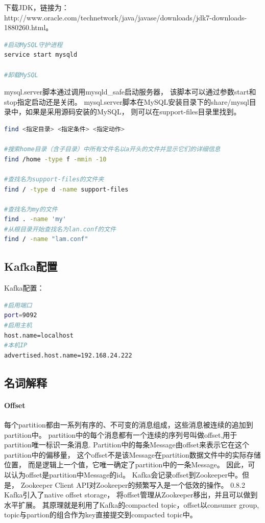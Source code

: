 \documentclass{book}
\begin{document}
下载JDK，链接为：http://www.oracle.com/technetwork/java/javase/downloads/jdk7-downloads-1880260.html。

\begin{lstlisting}[language=Bash]
#启动MySQL守护进程
service start mysqld

#卸载MySQL

\end{lstlisting}

mysql.server脚本通过调用mysqld\_safe启动服务器，
该脚本可以通过参数start和stop指定启动还是关闭。
mysql.server脚本在MySQL安装目录下的share/mysql目录中，如果是采用源码安装的MySQL，
则可以在support-files目录里找到。

\begin{lstlisting}[language=Bash]
find <指定目录> <指定条件> <指定动作>

#搜索home目录（含子目录）中所有文件名以a开头的文件并显示它们的详细信息
find /home -type f -mmin -10

#查找名为support-files的文件夹
find / -type d -name support-files

#查找名为my的文件
find . -name 'my'
#从根目录开始查找名为lan.conf的文件
find / -name "lam.conf"
\end{lstlisting}

\subsection{Kafka配置}

Kafka配置：

\begin{lstlisting}[language=Bash]
#启用端口
port=9092
#启用主机
host.name=localhost
#本机IP
advertised.host.name=192.168.24.222
\end{lstlisting}



\subsection{名词解释}

\paragraph{Offset}

每个partition都由一系列有序的、不可变的消息组成，这些消息被连续的追加到partition中。
partition中的每个消息都有一个连续的序列号叫做offset,用于partition唯一标识一条消息.
Partition中的每条Message由offset来表示它在这个partition中的偏移量，
这个offset不是该Message在partition数据文件中的实际存储位置，
而是逻辑上一个值，它唯一确定了partition中的一条Message。
因此，可以认为offset是partition中Message的id。
Kafka会记录offset到Zookeeper中。但是，
Zookeeper Client API对Zookeeper的频繁写入是一个低效的操作。
0.8.2 Kafka引入了native offset storage，
将offset管理从Zookeeper移出，并且可以做到水平扩展。
其原理就是利用了Kafka的compacted topic，offset以consumer group,
topic与partion的组合作为key直接提交到compacted topic中。
\end{document}
